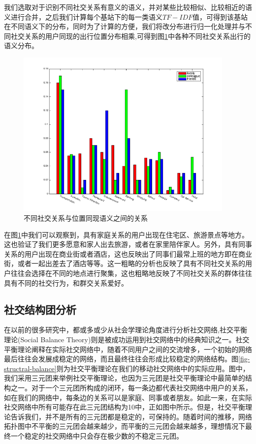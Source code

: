 我们选取对于识别不同社交关系有意义的语义，并对某些比较相似、比较相近的语义进行合并，之后我们计算每个基站下的每一类语义$TF-IDF$值，可得到该基站在不同语义下的分布，同时为了计算的方便，我们将改分布进行归一化处理并与不同社交关系的用户同现的出行位置分布相乘,可得到图\ref{fig-spatial-context}中各种不同社交关系出行的语义分布。



\begin{figure}[ht]
    \centering
    \includegraphics[scale=1, width=0.95\textwidth]{figure/contextDistribution.png}
    \caption{不同社交关系与位置同现语义之间的关系}
    \label{fig-spatial-context}
\end{figure}


在图\ref{fig-spatial-context}中我们可以观察到，具有家庭关系的用户出现在住宅区、旅游景点等地方。这也验证了我们更多愿意和家人出去旅游，或者在家里陪伴家人。另外，具有同事关系的用户出现在商业街或者酒店，这也反映出了同事们最常上班的地方即在商业街，或者一起出差去了酒店等等。这一粗略的分析也反映了具有不同社交关系的用户往往会选择在不同的地点进行聚集，这也粗略地反映了不同社交关系的群体往往具有不同的社交行为，和群交关系爱好。



\subsection{社交结构团分析}
在以前的很多研究中，都或多或少从社会学理论角度进行分析社交网络,社交平衡理论(Social Balance Theory)则是被成功运用到社交网络中的经典知识之一。社交平衡理论阐释在实际社交网络中，随着不同用户之间的交流增多，一个初始的网络最后往往会发展成稳定的网络，而且最终往往会形成比较稳定的网络结构。图\ref{fig-structral-balance}则为社交平衡理论在我们的移动社交网络中的实际应用。图中，我们采用三元团来举例社交平衡理论，也因为三元团是社交平衡理论中最简单的结构之一。对于一个三元团所构成的闭环，每一条边都代表社交网络中用户的关系，如在我们的网络中，每条边的关系可以是家庭、同事或者朋友。如此一来，在实际社交网络中所有可能存在此三元团结构为10中，正如图中所示。但是，社交平衡理论告诉我们，并不是所有的三元团都是稳定的，可保持的。随着时间的推移，网络拓扑图中不平衡的三元团会越来越少，而平衡的三元团会越来越多，理想情况下最终一个稳定的社交网络中只会存在极少数的不稳定三元团。



